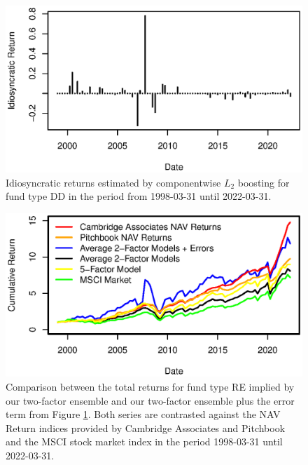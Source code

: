 \begin{figure}[H]
	\centering
	\includegraphics{Figures/XErrorSeriesDD}
	\caption{Idiosyncratic returns estimated by componentwise $L_2$ boosting for fund type DD in the period from 1998-03-31 until 2022-03-31.}
	\label{fig:clb_idio_DD}
\end{figure}

\begin{figure}[H]
	\centering
	\includegraphics{Figures/XTotalErrorSeriesDD}
	\caption{
		Comparison between the total returns for fund type RE implied by our two-factor ensemble and our two-factor ensemble plus the error term from Figure \ref{fig:clb_idio_DD}.
		Both series are contrasted against the NAV Return indices provided by Cambridge Associates and Pitchbook and the MSCI stock market index in the period 1998-03-31 until 2022-03-31.
	}
	\label{fig:clb_total_DD}
\end{figure}

